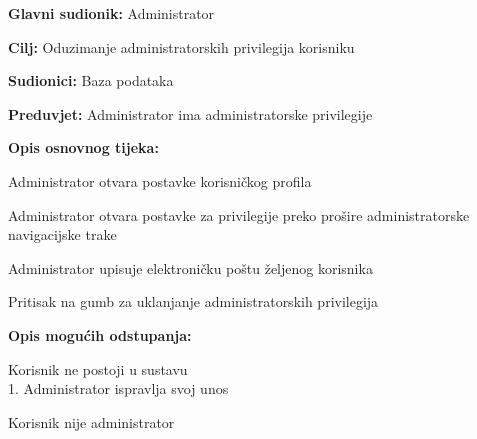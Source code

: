 					\noindent {}
					\begin{packed_item}
						\item \textbf{Glavni sudionik:} Administrator
						\item \textbf{Cilj:} Oduzimanje administratorskih privilegija korisniku
						\item \textbf{Sudionici:} Baza podataka
						\item \textbf{Preduvjet:} Administrator ima administratorske privilegije
						\item \textbf{Opis osnovnog tijeka:}
						\begin{packed_enum}
							\item Administrator otvara postavke korisničkog profila
							\item Administrator otvara postavke za privilegije preko prošire administratorske navigacijske trake
							\item Administrator upisuje elektroničku poštu željenog korisnika 
							\item Pritisak na gumb za uklanjanje administratorskih privilegija
						\end{packed_enum}
						\item \textbf{Opis mogućih odstupanja:}
						\begin{packed_item}
							\item [3.a] Korisnik ne postoji u sustavu
							\\1. Administrator ispravlja svoj unos
							\item [4.a] Korisnik nije administrator
						\end{packed_item}
					\end{packed_item}


